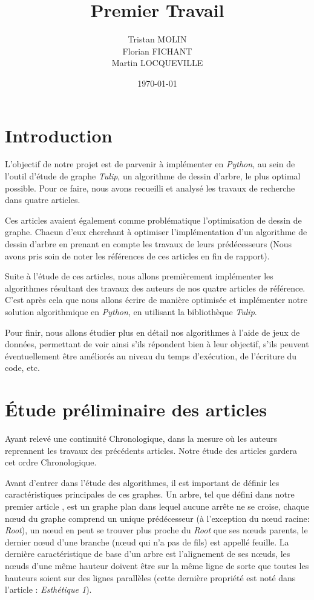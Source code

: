\documentclass{article}
\title{Premier Travail}
\author{Tristan MOLIN\\Florian FICHANT\\Martin LOCQUEVILLE}
\date{\today}
\begin{document}
\maketitle

\tableofcontents

\newpage

\mainmatter

\section{Introduction}

L'objectif de notre projet est de parvenir à implémenter en \emph{Python}, au sein de l'outil d'étude de graphe \emph{Tulip}, un algorithme de dessin d'arbre, le plus optimal possible. Pour ce faire, nous avons recueilli et analysé les travaux de recherche dans quatre articles.

Ces articles avaient également comme problématique l'optimisation de dessin de graphe. Chacun d'eux cherchant à optimiser l'implémentation d'un algorithme de dessin d'arbre en prenant en compte les travaux de leurs prédécesseurs (Nous avons pris soin de noter les références de ces articles en fin de rapport).

Suite à l'étude de ces articles, nous allons premièrement implémenter les algorithmes résultant des travaux des auteurs de nos quatre articles de référence. C'est après cela que nous allons écrire de manière optimisée et implémenter notre solution algorithmique en \emph{Python}, en utilisant la bibliothèque \emph{Tulip}.

Pour finir, nous allons étudier plus en détail nos algorithmes à l'aide de jeux de données, permettant de voir ainsi s'ils répondent bien à leur objectif, s'ils peuvent éventuellement être améliorés au niveau du temps d'exécution, de l'écriture du code, etc.


\newpage
\section{Étude préliminaire des articles}

Ayant relevé une continuité Chronologique, dans la mesure où les auteurs reprennent les travaux des précédents articles. Notre étude des articles gardera cet ordre Chronologique.

Avant d'entrer dans l'étude des algorithmes, il est important de définir les caractéristiques principales de ces graphes. Un arbre, tel que défini dans notre premier article \cite{artcile79}, est un graphe plan dans lequel aucune arrête ne se croise, chaque n\oe{}ud du graphe comprend un unique prédécesseur (à l'exception du n\oe{}ud racine: \emph{Root}), un n\oe{}ud en peut se trouver plus proche du \emph{Root} que ses n\oe{}uds parents, le dernier n\oe{}ud d'une branche (n\oe{}ud qui n'a pas de fils) est appellé feuille. La dernière caractéristique de base d'un arbre est l'alignement de ses n\oe{}uds, les n\oe{}uds d’une même hauteur doivent être sur la même ligne de sorte que toutes les hauteurs soient sur des lignes parallèles (cette dernière propriété est noté dans l'article \cite{article79}: \emph{Esthétique 1}).
\end{document}
